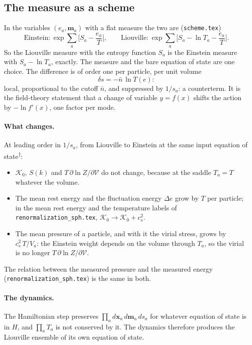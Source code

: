 \documentclass[11pt,aps,preprint,nofootinbib,superscriptaddress,tightenlines]{revtex4-2}
\def\st{\begin{equation}}
\def\stp{\end{equation}}
\let\oldparagraph\paragraph
\renewcommand{\paragraph}{\par\bigskip\oldparagraph}
\newcommand{\unv}{\textsuperscript{$\dagger$}}
\begin{document}
\subsection{The measure as a scheme}
\label{sec:scheme}

In the variables $(e_a,\bm m_a)$ with a flat measure the two are (\texttt{scheme.tex})
\st
\text{Einstein:}\ \exp\sum_a\Big[S_a-\frac{e_a}T\Big],\qquad
\text{Liouville:}\ \exp\sum_a\Big[S_a-\ln T_a-\frac{e_a}T\Big] .
\stp
So the Liouville measure with the entropy function $S_a$ is the Einstein measure with $S_a-\ln T_a$, exactly.  The measure and the bare
equation of state are one choice.  The difference is of order one per particle, per unit volume
\st
\delta s=-\bar n\,\ln T(e) :
\stp
local, proportional to the cutoff $\bar n$, and suppressed by $1/s_a$: a counterterm.  It is the field-theory statement that a change of
variable $y=f(x)$ shifts the action by $-\ln f'(x)$, one factor per mode.

\paragraph{What changes.}  At leading order in $1/s_a$, from Liouville to Einstein at the same input equation of state\unv:
\begin{itemize}
\item $\mathcal K_0$, $S(k)$ and $T\,\partial\ln Z/\partial\mathcal V$ do not change, because at the saddle $T_a=T$ whatever the volume.
\item The mean rest energy and the fluctuation energy $\Delta e$ grow by $T$ per particle; in the mean rest energy and the temperature labels of \nolinkurl{renormalization_sph.tex}, $\mathcal K_0\to\mathcal K_0+c_s^2$.
\item The mean pressure of a particle, and with it the virial stress, grows by $c_s^2\,T/V_a$: the Einstein weight depends on the volume through
  $T_a$, so the virial is no longer $T\,\partial\ln Z/\partial\mathcal V$.
\end{itemize}
The relation between the measured pressure and the measured energy (\nolinkurl{renormalization_sph.tex}) is the same in both.

\paragraph{The dynamics.}  The Hamiltonian step preserves $\prod_ad\bm x_a\,d\bm m_a\,ds_a$ for whatever equation of state is in $H$, and
$\prod_aT_a$ is not conserved by it.  The dynamics therefore produces the Liouville ensemble of its own equation of state.
\end{document}
